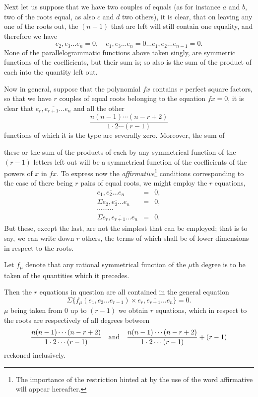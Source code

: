 \documentclass[11pt]{article}
\newcommand{\sourcepage}[1]{\marginpar{\scriptsize p.~#1}}
\newcommand{\pgram}[1]{\overline{#1}}
\begin{document}
Next let us suppose that we have two couples of equals (as for instance $a$ and $b$, two of the roots equal, as also $c$ and $d$ two others), it is clear, that on leaving any one of the roots out, the $(n-1)$ that are left will still contain one equality, and therefore we have
\[
\pgram{e_2,e_3\ldots e_n}=0,\quad
\pgram{e_1,e_3\ldots e_n}=0\ldots
\pgram{e_1,e_2\ldots e_{n-1}}=0.
\]
None of the parallelogrammatic functions above taken singly, are symmetric functions of the coefficients, but their sum is; so also is the sum of the product of each into the quantity left out.

Now in general, suppose that the polynomial $fx$ contains $r$ perfect square factors, so that we have $r$ couples of equal roots belonging to the equation $fx=0$, it is clear that $\pgram{e_r,e_{r+1}\ldots e_n}$ and all the other
\[
 \frac{n(n-1)\cdots(n-r+2)}{1\cdot2\cdots(r-1)}
\]
functions of which it is the type are severally zero. Moreover, the sum of

\sourcepage{70}
these or the sum of the products of each by any symmetrical function of the $(r-1)$ letters left out will be a symmetrical function of the coefficients of the powers of $x$ in $fx$. To express now the \emph{affirmative}\footnote{The importance of the restriction hinted at by the use of the word affirmative will appear hereafter.} conditions corresponding to the case of there being $r$ pairs of equal roots, we might employ the $r$ equations,
\[
\begin{array}{rcl}
\pgram{e_1,e_2\ldots e_n}&=&0,\\
\Sigma\pgram{e_2,e_3\ldots e_n}&=&0,\\
\cdots\cdots\cdots&&\\
\Sigma\pgram{e_r,e_{r+1}\ldots e_n}&=&0.
\end{array}
\]
But these, except the last, are not the simplest that can be employed; that is to say, we can write down $r$ others, the terms of which shall be of lower dimensions in respect to the roots.

Let $f_\mu$ denote that any rational symmetrical function of the $\mu$th degree is to be taken of the quantities which it precedes.

Then the $r$ equations in question are all contained in the general equation
\[
\Sigma\{f_\mu(e_1,e_2\ldots e_{r-1})\times
\pgram{e_r,e_{r+1}\ldots e_n}\}=0.
\]
$\mu$ being taken from $0$ up to $(r-1)$ we obtain $r$ equations, which in respect to the roots are respectively of all degrees between
\[
 \frac{n(n-1)\cdots(n-r+2)}{1\cdot2\cdots(r-1)}
 \quad\hbox{and}\quad
 \frac{n(n-1)\cdots(n-r+2)}{1\cdot2\cdots(r-1)}+(r-1)
\]
reckoned inclusively.
\end{document}
